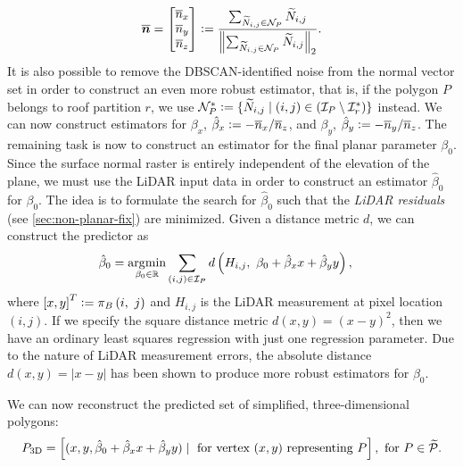 \begin{equation*}
  \overline{\boldsymbol{n}}
  =
  \begin{bmatrix}
    \overline{n}_x\\
    \overline{n}_y\\
    \overline{n}_z
  \end{bmatrix}
  \vcentcolon=
  \frac{
    \sum_{\widetilde{N}_{i,j} \in \mathcal{N}_P} \widetilde{N}_{i,j}
  }{
    \left\lVert\sum_{\widetilde{N}_{i,j} \in \mathcal{N}_P} \widetilde{N}_{i,j}\right\rVert_2
  }.
\end{equation*}
It is also possible to remove the DBSCAN-identified noise from the normal vector set in order to construct an even more robust estimator, that is, if the polygon $P$ belongs to roof partition $r$, we use $\mathcal{N}_{P}^* \vcentcolon= \{\widetilde{N}_{i,j} \mid (i,j) \in (\mathcal{I}_P \setminus \mathcal{I}_r^*) \}$ instead.
We can now construct estimators for $\beta_x$, $\hat{\beta}_x \vcentcolon= -\overline{n}_x / \overline{n}_z$, and $\beta_y$, $\hat{\beta}_y \vcentcolon= -\overline{n}_y / \overline{n}_z$.
The remaining task is now to construct an estimator for the final planar parameter $\beta_0$.
Since the surface normal raster is entirely independent of the elevation of the plane, we must use the LiDAR input data in order to construct an estimator $\hat{\beta}_0$ for $\beta_0$.
The idea is to formulate the search for $\hat{\beta}_0$ such that the \textit{LiDAR residuals} (see \cref{sec:non-planar-fix}) are minimized.
Given a distance metric $d$, we can construct the predictor as
\begin{align*}
  \hat{\beta}_0
  &=
  \operatorname*{\arg\!\min}_{\beta_0 \in \mathbb{R}}
  \sum_{(i,j) \in \mathcal{I}_P}
  d\left(
    H_{i,j},~
    \beta_0 + \hat{\beta}_x x + \hat{\beta}_y y
  \right),
\end{align*}
where ${[x, y]}^T \vcentcolon= \pi_{B}\left(i,~j\right)$ and $H_{i,j}$ is the LiDAR measurement at pixel location $(i,j)$.
If we specify the square distance metric $d(x, y) = (x - y)^2$, then we have an ordinary least squares regression with just one regression parameter.
Due to the nature of LiDAR measurement errors, the absolute distance $d(x, y) = |x - y|$ has been shown to produce more robust estimators for $\beta_0$.

We can now reconstruct the predicted set of simplified, three-dimensional polygons:
\begin{equation*}
  P_{\mathrm{3D}}
  =
  \left[
    (x, y, \hat{\beta}_0 + \hat{\beta}_x x + \hat{\beta}_y y)
    \mid
    \text{ for vertex } (x, y) \text{ representing } P
  \right],
  \text{ for } P \in \widetilde{\mathcal{P}}.
\end{equation*}
